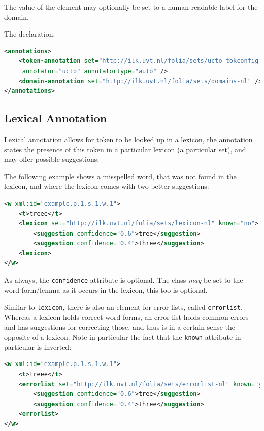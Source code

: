 \documentclass[a4paper,12pt]{report}
\begin{document}
The value of the element may optionally be set to a human-readable label for the domain.

The declaration:

\begin{lstlisting}[language=xml]
<annotations>
    <token-annotation set="http://ilk.uvt.nl/folia/sets/ucto-tokconfig-nl"
     annotator="ucto" annotatortype="auto" />
    <domain-annotation set="http://ilk.uvt.nl/folia/sets/domains-nl" />
</annotations>
\end{lstlisting}

\subsection{Lexical Annotation}

Lexical annotation allows for token to be looked up in a lexicon, the annotation states the presence of this token in a particular lexicon (a particular set), and may offer possible suggestions.

The following example shows a misspelled word, that was not found in the lexicon, and where the lexicon comes with two better suggestions:


\begin{lstlisting}[language=xml]
<w xml:id="example.p.1.s.1.w.1">
    <t>treee</t>
    <lexicon set="http://ilk.uvt.nl/folia/sets/lexicon-nl" known="no">
        <suggestion confidence="0.6">tree</suggestion>
        <suggestion confidence="0.4">three</suggestion>
    <lexicon>
</w>
\end{lstlisting}


As always, the \texttt{confidence} attribute is optional. The class \emph{may} be set to the word-form/lemma as it occurs in the lexicon, this too is optional.

Similar to \texttt{lexicon}, there is also an element for error lists, called \texttt{errorlist}. Whereas a lexicon holds correct word forms, an error list holds common errors and has suggestions for correcting those, and thus is in a certain sense the opposite of a lexicon. Note in particular the fact that the \texttt{known} attribute in particular is inverted:


\begin{lstlisting}[language=xml]
<w xml:id="example.p.1.s.1.w.1">
    <t>treee</t>
    <errorlist set="http://ilk.uvt.nl/folia/sets/errorlist-nl" known="yes">    
        <suggestion confidence="0.6">tree</suggestion>
        <suggestion confidence="0.4">three</suggestion>
    <errorlist>
</w>
\end{lstlisting}
\end{document}
